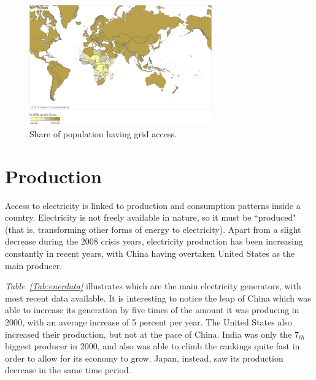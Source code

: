 \documentclass[a4paper,12pt]{book}
\begin{document}
\begin{figure}[hbt]
\begin{center}
\captionsetup{justification=centering}
\includegraphics[width=0.7\textwidth]{Images/access.png}
\caption{Share of population having grid access. }
\label{fig:gridAcc}
\end{center}
\end{figure}

\section{Production}

Access to electricity is linked to production and consumption patterns inside a country. Electricity is not freely available in nature, so it must be ``produced" (that is, transforming other forms of energy to electricity). Apart from a slight decrease during the 2008 crisis years, electricity production has been increasing constantly in recent years, with China having overtaken United States as the main producer.

\textit{Table~\ref{Tab:enerdata}} illustrates which are the main electricity generators, with most recent data available. It is interesting to notice the leap of China which was able to increase its generation by five times of the amount it was producing in 2000, with an average increase of 5 percent per year. The United States also increased their production, but not at the pace of China. India was only the $7_{th}$ biggest producer in 2000, and also was able to climb the rankings quite fast in order to allow for its economy to grow. Japan, instead, saw its production decrease in the same time period.
\end{document}
